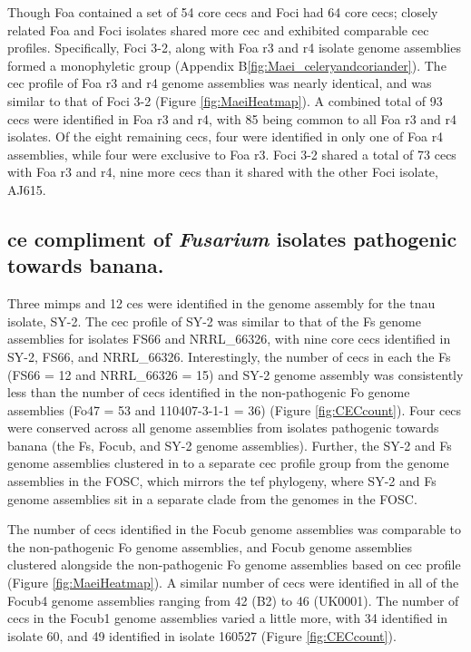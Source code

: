 Though \ac{Foa} contained a set of 54 core \acp{cec} and \ac{Foci} had 64 core \acp{cec}; closely related \ac{Foa} and \ac{Foci} isolates shared more \ac{cec} and exhibited comparable \ac{cec} profiles. Specifically, \ac{Foci} 3-2, along with \ac{Foa} \ac{r3} and \ac{r4} isolate genome assemblies formed a monophyletic group (Appendix B\ref{fig:Maei_celeryandcoriander}). The \ac{cec} profile of \ac{Foa} \ac{r3} and \ac{r4} genome assemblies was nearly identical, and was similar to that of \ac{Foci} 3-2 (Figure \ref{fig:MaeiHeatmap}). A combined total of 93 \acp{cec} were identified in \ac{Foa} \ac{r3} and \ac{r4}, with 85 being common to all \ac{Foa} \ac{r3} and \ac{r4} isolates. Of the eight remaining \acp{cec}, four were identified in only one of \ac{Foa} \ac{r4} assemblies, while four were exclusive to \ac{Foa} \ac{r3}. \ac{Foci} 3-2 shared a total of 73 \acp{cec} with \ac{Foa} \ac{r3} and \ac{r4}, nine more \acp{cec} than it shared with the other \ac{Foci} isolate, AJ615. 


\subsection{\Acl{ce} compliment of \textit{Fusarium} isolates pathogenic towards banana.} 

 Three \acp{mimp} and 12 \acp{ce} were identified in the genome assembly for the \ac{tnau} isolate, SY-2. The \ac{cec} profile of SY-2 was similar to that of the \ac{Fs} genome assemblies for isolates FS66 and NRRL\_66326, with nine core \acp{cec} identified in SY-2, FS66, and NRRL\_66326.  Interestingly, the number of \acp{cec} in each the \ac{Fs} (FS66 = 12 and NRRL\_66326 = 15) and SY-2 genome assembly was consistently less than the number of \acp{cec} identified in the non-pathogenic \ac{Fo} genome assemblies (Fo47 = 53 and 110407-3-1-1 = 36) (Figure \ref{fig:CECcount}). Four \acp{cec} were conserved across all genome assemblies from isolates pathogenic towards banana (the \ac{Fs}, \ac{Focub}, and SY-2 genome assemblies). Further, the SY-2 and \ac{Fs} genome assemblies clustered in to a separate \ac{cec} profile group from the genome assemblies in the \ac{FOSC}, which mirrors the \ac{tef} phylogeny, where SY-2 and \ac{Fs} genome assemblies sit in a separate clade from the genomes in the \ac{FOSC}.

The number of \acp{cec} identified in the \ac{Focub} genome assemblies was comparable to the non-pathogenic \ac{Fo} genome assemblies, and \ac{Focub} genome assemblies clustered alongside the non-pathogenic \ac{Fo} genome assemblies based on \ac{cec} profile (Figure \ref{fig:MaeiHeatmap}). A similar number of \acp{cec} were identified in all of the \ac{Focub4} genome assemblies ranging from 42 (B2) to 46 (UK0001). The number of \acp{cec} in the \ac{Focub1} genome assemblies varied a little more, with 34 identified in isolate 60, and 49 identified in isolate 160527 (Figure \ref{fig:CECcount}). 

